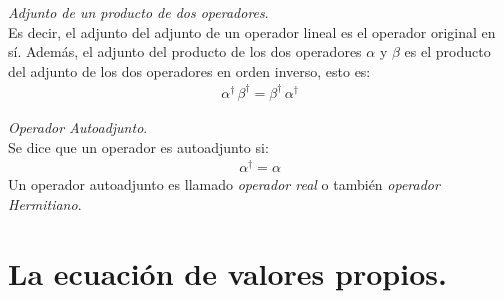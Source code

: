 \noindent
\emph{Adjunto de un producto de dos operadores}.
\\[0.5em]
\noindent
Es decir, el adjunto del adjunto de un operador lineal es el operador original en sí. Además, el adjunto del producto de los dos operadores $\alpha$ y $\beta$ es el producto del adjunto de los dos operadores en orden inverso, esto es:
\begin{align}
\alpha^{\dagger} \, \beta^{\dagger} = \beta^{\dagger} \, \alpha^{\dagger}
\label{eq:ecuacion_24}
\end{align}

\noindent
\emph{Operador Autoadjunto}.
\\[0.5em]
\noindent
Se dice que un operador es autoadjunto si:
\begin{align}
\alpha^{\dagger} = \alpha
\label{eq:ecuacion_29}
\end{align}
Un operador autoadjunto es llamado \emph{operador real} o también \emph{operador Hermitiano}.

\section{La ecuación de valores propios.}

